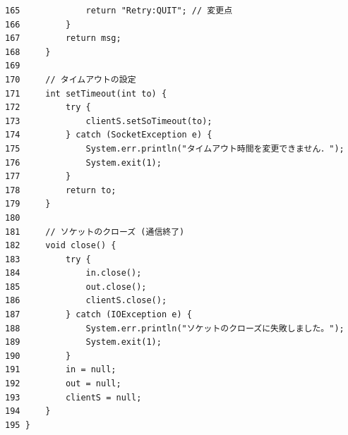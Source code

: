 \documentclass[11pt,a4j]{jarticle}
\begin{document}
\begin{small}
\begin{verbatim}
165             return "Retry:QUIT"; // 変更点
166         }
167         return msg;
168     }
169 
170     // タイムアウトの設定
171     int setTimeout(int to) {
172         try {
173             clientS.setSoTimeout(to);
174         } catch (SocketException e) {
175             System.err.println("タイムアウト時間を変更できません．");
176             System.exit(1);
177         }
178         return to;
179     }
180 
181     // ソケットのクローズ (通信終了)
182     void close() {
183         try {
184             in.close();
185             out.close();
186             clientS.close();
187         } catch (IOException e) {
188             System.err.println("ソケットのクローズに失敗しました。");
189             System.exit(1);
190         }
191         in = null;
192         out = null;
193         clientS = null;
194     }
195 }
\end{verbatim}
\end{small}
\end{document}
